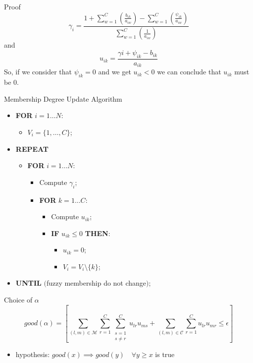 \documentclass{beamer}
\begin{document}
\begin{frame}{Proof}
\begin{equation}
\gamma_{i} = 
\frac
{
1
+
\sum_{w=1}^{C}
\left (
\frac{b_{ik}}{a_{iw}}
\right )
-
\sum_{w=1}^{C}
\left (
\frac{\psi_{ik}}{a_{iw}}
\right )
}
{
\sum_{w=1}^{C}
\left (
\frac
{1}
{a_{iw}}
\right )
}
\end{equation}
and
\begin{equation}
u_{ik} =
\frac
{\gamma{i} + \psi_{ik} - b_{ik}}
{a_{ik}}
\end{equation}
So, if we consider that $\psi_{ik} = 0$ and we get $u_{ik} < 0$ we can conclude that $u_{ik}$ must be $0$.
\end{frame}

\begin{frame}{Membership Degree Update Algorithm}
\begin{itemize}
\item[]\textbf{FOR} $i = 1 \ldots N$:
\begin{itemize}
	\item[]$V_{i}=\{1,\ldots,C\}$;
\end{itemize}
\item[]\textbf{REPEAT}
\begin{itemize}
	\item[]\textbf{FOR} $i = 1 \ldots N$:
	\begin{itemize}
		\item[]Compute $\gamma_{i}$;
		\item[]\textbf{FOR} $k = 1 \ldots C$:
		\begin{itemize}
			\item[]Compute $u_{ik}$;
			\item[]\textbf{IF} $u_{ik} \leq 0$ \textbf{THEN}:
			\begin{itemize}
				\item[]$u_{ik} = 0$;
				\item[]$V_{i}=V_{i}\setminus\{k\}$;
			\end{itemize}
		\end{itemize}
	\end{itemize}
\end{itemize}
\item[]\textbf{UNTIL} $($fuzzy membership do not change$)$;
\end{itemize}
\end{frame}

\begin{frame}{Choice of $\alpha$}
\begin{equation*}
\label{restriction-equation}
good(\alpha)=
\left[
\sum_{(l,m)\in\mathcal{M}}\sum_{r=1}^{C}\sum_{\substack{s=1\\{s}\neq{r}}}^{C}u_{lr}u_{ms}+\sum_{(l,m)\in\mathcal{C}}\sum_{r=1}^{C}u_{lr}u_{mr}
\leq \epsilon
\right]
\end{equation*}
\begin{itemize}
\item{hypothesis: $good(x) \implies good(y) \quad \forall y \geq x$ is true}
\end{itemize}
\end{frame}
\end{document}
